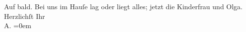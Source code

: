 \begin{ledgroupsized}[t]{13cm}
           \pstart
           Auf bald. Bei uns im Hauſe lag oder liegt alles; jetzt die Kinderfrau und Olga.\pend
           \pstart
           Herzlichſt Ihr {\\[\baselineskip]}\spacefill\mbox{A.}\pend
           \leftskip=0em{}
         
         \endnumbering{}\end{ledgroupsized}  \newcommand{\dateiname}{L02996}\newcommand{\titel}{Arthur Schnitzler an Felix Salten, 12. 1. 1905}\newcommand{\editorInnen}{Martin Anton Müller und Laura Untner}
      